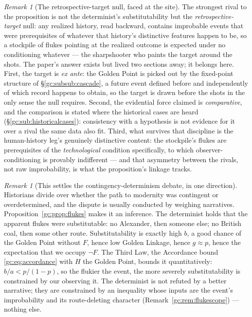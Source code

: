 \documentclass[11pt]{article}
\numberwithin{equation}{section}
\theoremstyle{plain}
\theoremstyle{definition}
\theoremstyle{remark}
\newtheorem{remark}[theorem]{Remark}
\begin{document}
\begin{remark}[The retrospective-target null, faced at the site]
\label{gc:rem:sharpshooter}
The strongest rival to the proposition is not the determinist's
substitutability but the \emph{retrospective-target} null: any
realized history, read backward, contains improbable events that were
prerequisites of whatever that history's distinctive features happen
to be, so a stockpile of flukes pointing at the realized outcome is
expected under no conditioning whatever --- the sharpshooter who
paints the target around the shots. The paper's answer exists but
lived two sections away; it belongs here. First, the target is
\emph{ex ante}: the Golden Point is picked out by the fixed-point
structure of \S\ref{gc:subsub:cascade}, a future event defined
before and independently of which record happens to obtain, so the
target is drawn before the shots in the only sense the null requires.
Second, the evidential force claimed is \emph{comparative}, and the
comparison is stated where the historical cases are heard
(\S\ref{gc:sub:historicalcases}): consistency with a hypothesis is
not evidence for it over a rival the same data also fit. Third, what
survives that discipline is the human-history leg's genuinely
distinctive content: the stockpile's flukes are prerequisites of the
\emph{technological} condition specifically, to which
observer-conditioning is provably indifferent --- and that asymmetry
between the rivals, not raw improbability, is what the proposition's
linkage tracks.
\end{remark}

\begin{remark}[This settles the contingency-determinism debate, in one
direction]\label{gc:rem:determinism}
Historians divide over whether the path to modernity was contingent or
overdetermined, and the dispute is usually conducted by weighing
narratives. Proposition~\ref{gc:prop:flukes} makes it an inference. The determinist holds that the apparent flukes were substitutable: no
Alexander, then someone else; no British coal, then some other route.
Substitutability is exactly high $b$, a good chance of the Golden
Point without $F$, hence low Golden Linkage, hence $g \approx p$,
hence the expectation that we occupy $\neg F$. The Third Law, the
Accordance bound \eqref{gc:eq:accordance} with $H$ the Golden Point, bounds it quantitatively: $b/a < p/(1-p)$, so the flukier the event, the more
severely substitutability is constrained by our observing it. The
determinist is not refuted by a better narrative; they are constrained
by an inequality whose inputs are the event's improbability and its
route-deleting character (Remark~\ref{gc:rem:flukescope}) --- nothing
else.
\end{remark}
\end{document}
